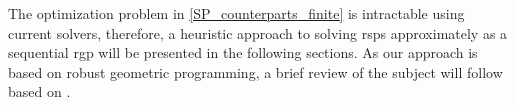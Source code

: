 The optimization problem in \eqref{SP_counterparts_finite} is intractable using current solvers,
therefore,  a heuristic approach to solving \gls{rsp}s approximately
as a sequential \gls{rgp} will be presented in the following sections.
As our approach is based on robust geometric programming,
a brief review of the subject will follow based on \cite{Saab2018}.
